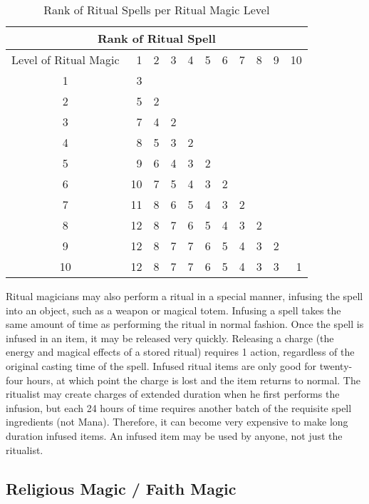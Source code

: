 \begin{table}[!htb]
\begin{center}
\begin{tabular}{c|r|r|r|r|r|r|r|r|r|r|}
\multicolumn{11}{c}{Rank of Ritual Spell} \\
\hline
\hline
Level of Ritual Magic & 1 & 2 & 3 & 4 & 5 & 6 & 7 & 8 & 9 & 10 \\
\hline
1 & 3 \\ \cline{1-3}
2 & 5 & 2 \\ \cline{1-4}
3 & 7 & 4 & 2 \\ \cline{1-5}
4 & 8 & 5 & 3 & 2 \\ \cline{1-6}
5 & 9 & 6 & 4 & 3 & 2 \\ \cline{1-7}
6 & 10 & 7 & 5 & 4 & 3 & 2 \\ \cline{1-8}
7 & 11 & 8 & 6 & 5 & 4 & 3 & 2 \\ \cline{1-9}
8 & 12 & 8 & 7 & 6 & 5 & 4 & 3 & 2 \\ \cline{1-10}
9 & 12 & 8 & 7 & 7 & 6 & 5 & 4 & 3 & 2 \\ \cline{1-11}
10 & 12 & 8 & 7 & 7 & 6 & 5 & 4 & 3 & 3 & 1 \\ \hline
\end{tabular}
\caption{Rank of Ritual Spells per Ritual Magic Level}
\end{center}
\end{table}

Ritual magicians may also perform a ritual in a special manner,
infusing the spell into an object, such as a weapon or magical totem.
Infusing a spell takes the same amount of time as performing the
ritual in normal fashion.  Once the spell is infused in an item, it
may be released very quickly.  Releasing a charge (the energy and
magical effects of a stored ritual) requires 1 action, regardless of
the original casting time of the spell.  Infused ritual items are only
good for twenty-four hours, at which point the charge is lost and the
item returns to normal.  The ritualist may create charges of extended
duration when he first performs the infusion, but each 24 hours of
time requires another batch of the requisite spell ingredients (not
Mana).  Therefore, it can become very expensive to make long duration
infused items.  An infused item may be used by anyone, not just the
ritualist.

\subsection{Religious Magic / Faith Magic}


